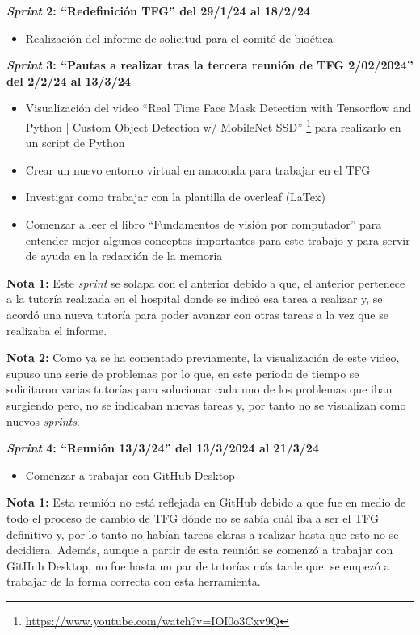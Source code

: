 \textbf{\textit{Sprint} 2: ``Redefinición TFG'' del 29/1/24 al 18/2/24}
\begin{itemize}
    \item Realización del informe de solicitud para el comité de bioética 
\end{itemize}

\textbf{\textit{Sprint} 3: ``Pautas a realizar tras la tercera reunión de TFG 2/02/2024'' del 2/2/24 al 13/3/24}
\begin{itemize}
    \item Visualización del video ``Real Time Face Mask Detection with Tensorflow and Python | Custom Object Detection w/ MobileNet SSD'' \footnote{\url{https://www.youtube.com/watch?v=IOI0o3Cxv9Q}} para realizarlo en un script de Python
    \item Crear un nuevo entorno virtual en anaconda para trabajar en el TFG
    \item Investigar como trabajar con la plantilla de overleaf (LaTex)
    \item Comenzar a leer el libro ``Fundamentos de visión por computador'' para entender mejor algunos conceptos importantes para este trabajo y para servir de ayuda en la redacción de la memoria
\end{itemize}

\textbf{Nota 1:} Este \textit{sprint} se solapa con el anterior debido a que, el anterior pertenece a la tutoría realizada en el hospital donde se indicó esa tarea a realizar y, se acordó una nueva tutoría para poder avanzar con otras tareas a la vez que se realizaba el informe.

\textbf{Nota 2:} Como ya se ha comentado previamente, la visualización de este video, supuso una serie de problemas por lo que, en este periodo de tiempo se solicitaron varias tutorías para solucionar cada uno de los problemas que iban surgiendo pero, no se indicaban nuevas tareas y, por tanto no se visualizan como nuevos \textit{sprints}.

\textbf{\textit{Sprint} 4: ``Reunión 13/3/24'' del 13/3/2024 al 21/3/24}
\begin{itemize}
    \item Comenzar a trabajar con GitHub Desktop
\end{itemize}

\textbf{Nota 1:} Esta reunión no está reflejada en GitHub debido a que fue en medio de todo el proceso de cambio de TFG dónde no se sabía cuál iba a ser el TFG definitivo y, por lo tanto no habían tareas claras a realizar hasta que esto no se decidiera. Además, aunque a partir de esta reunión se comenzó a trabajar con GitHub Desktop, no fue hasta un par de tutorías más tarde que, se empezó a trabajar de la forma correcta con esta herramienta. 

